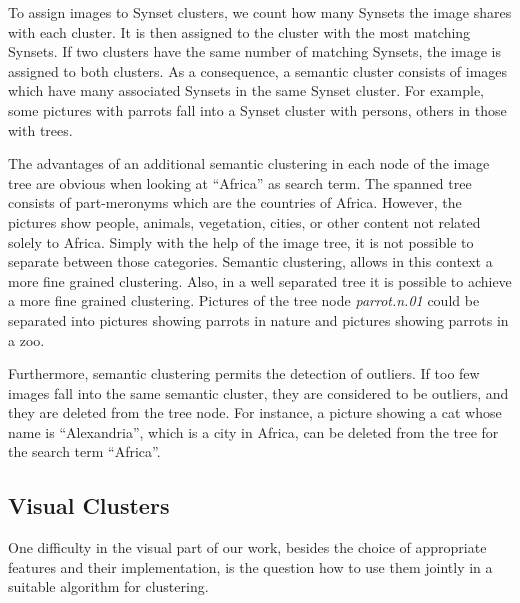 \bigskip
To assign images to Synset clusters, we count how many Synsets the image shares with each cluster. It is then assigned to the cluster with the most matching Synsets. If two clusters have the same number of matching Synsets, the image is assigned to both clusters. As a consequence, a semantic cluster consists of images which have many associated Synsets in the same Synset cluster. For example, some pictures with parrots fall into a Synset cluster with persons, others in those with trees.

\bigskip
The advantages of an additional semantic clustering in each node of the image tree are obvious when looking at ``Africa'' as search term. The spanned tree consists of part-meronyms which are the countries of Africa. However, the pictures show people, animals, vegetation, cities, or other content not related solely to Africa. Simply with the help of the image tree, it is not possible to separate between those categories. Semantic clustering, allows in this context a more fine grained clustering. Also, in a well separated tree it is possible to achieve a more fine grained clustering. Pictures of the tree node \emph{parrot.n.01} could be separated into pictures showing parrots in nature and pictures showing parrots in a zoo.

Furthermore, semantic clustering permits the detection of outliers. If too few images fall into the same semantic cluster, they are considered to be outliers, and they are deleted from the tree node. For instance, a picture showing a cat whose name is ``Alexandria'', which is a city in Africa, can be deleted from the tree for the search term ``Africa''.

\subsection{Visual Clusters}
\label{sec_visualclustering}

One difficulty in the visual part of our work, besides the choice of appropriate features and their implementation, is the question how to use them jointly in a suitable algorithm for clustering.

